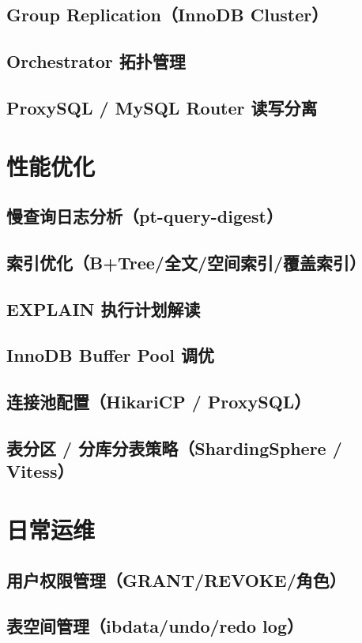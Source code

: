 \documentclass[12pt,UTF8]{ctexbook}
\begin{document}
    \subsection{Group Replication（InnoDB Cluster）}
    \subsection{Orchestrator 拓扑管理}
    \subsection{ProxySQL / MySQL Router 读写分离}

  \section{性能优化}
    \subsection{慢查询日志分析（pt-query-digest）}
    \subsection{索引优化（B+Tree/全文/空间索引/覆盖索引）}
    \subsection{EXPLAIN 执行计划解读}
    \subsection{InnoDB Buffer Pool 调优}
    \subsection{连接池配置（HikariCP / ProxySQL）}
    \subsection{表分区 / 分库分表策略（ShardingSphere / Vitess）}

  \section{日常运维}
    \subsection{用户权限管理（GRANT/REVOKE/角色）}
    \subsection{表空间管理（ibdata/undo/redo log）}
\end{document}
